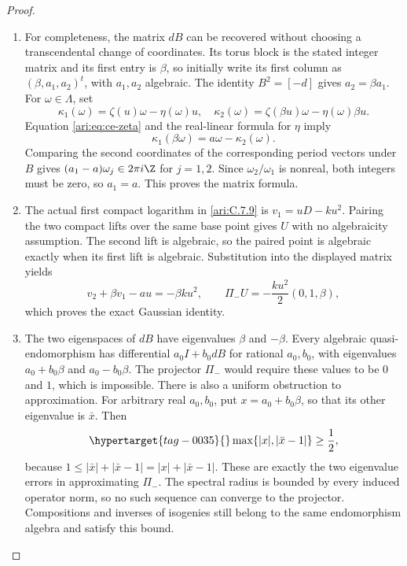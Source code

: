 \begin{proof}
\begin{enumerate}[label=\arabic*.,leftmargin=*]
\item For completeness, the matrix $dB$ can be recovered without
choosing a transcendental change of coordinates. Its torus
block is the stated integer matrix and its first entry is
$\beta$, so initially write its first column as
$(\beta,a_1,a_2)^t$, with $a_1,a_2$ algebraic.
The identity $B^2=[-d]$ gives $a_2=\beta a_1$.
For $\omega\in\Lambda$, set
\[
 \kappa_1(\omega)=\zeta(u)\omega-\eta(\omega)u,
 \quad
 \kappa_2(\omega)=\zeta(\beta u)\omega-\eta(\omega)\beta u.
\]
Equation \eqref{ari:eq:ce-zeta} and the real-linear formula for
$\eta$ imply
\[
 \kappa_1(\beta\omega)=a\omega-\kappa_2(\omega).
\]
Comparing the second coordinates of the corresponding period
vectors under $B$ gives
$(a_1-a)\omega_j\in2\pi i\Z$ for $j=1,2$.
Since $\omega_2/\omega_1$ is nonreal, both integers must
be zero, so $a_1=a$. This proves the matrix formula.

\item The actual first compact logarithm in \ref{ari:C.7.9} is
$v_1=uD-ku^2$. Pairing the two compact lifts over the same base
point gives $U$ with no algebraicity assumption. The second lift
is algebraic, so the paired point is algebraic exactly when its
first lift is algebraic.
Substitution into the displayed matrix yields
\[
 v_2+\beta v_1-au=-\beta ku^2,
 \qquad
 \Pi_-U=-\frac{ku^2}{2}(0,1,\beta),
\]
which proves the exact Gaussian identity.

\item The two eigenspaces of $dB$ have eigenvalues $\beta$ and
$-\beta$. Every algebraic quasi-endomorphism has differential
$a_0I+b_0dB$ for rational $a_0,b_0$, with eigenvalues
$a_0+b_0\beta$ and $a_0-b_0\beta$. The projector
$\Pi_-$ would require these values to be $0$ and $1$,
which is impossible. There is also a uniform obstruction to
approximation. For arbitrary real $a_0,b_0$, put
$x=a_0+b_0\beta$, so that its other eigenvalue is
$\bar x$. Then
\begin{equation}\hypertarget{tag-0035}{}\label{ari:eq:ce-gap}
 \max\{|x|,|\bar x-1|\}\ge\frac12,
\end{equation}
because $1\le|\bar x|+|\bar x-1|=|x|+|\bar x-1|$.
These are exactly the two eigenvalue errors in approximating
$\Pi_-$. The spectral radius is bounded by every induced
operator norm, so no such sequence can converge to the
projector. Compositions and inverses of isogenies still belong
to the same endomorphism algebra and satisfy this bound.


\end{enumerate}
\end{proof}
